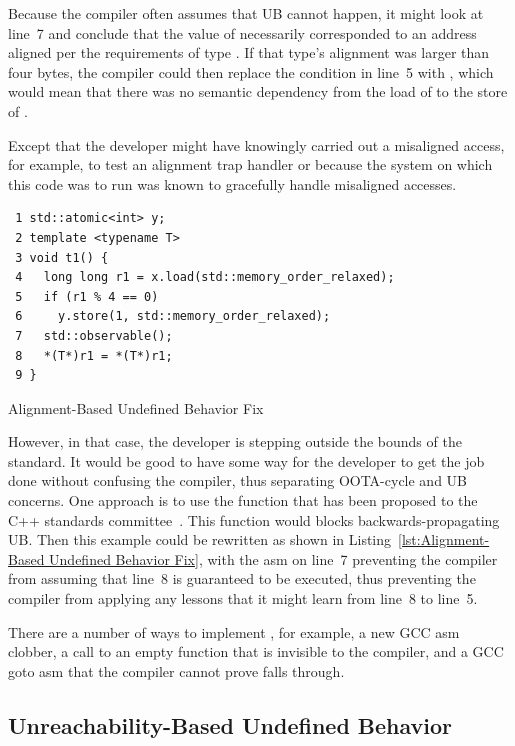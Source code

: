 \documentclass[10]{article}
\begin{document}
Because the compiler often assumes that UB cannot happen, it might
look at line~7 and conclude that the value of  necessarily
corresponded to an address aligned per the requirements of type .
If that type's alignment was larger than four bytes, the compiler could
then replace the condition in line~5 with , which would mean
that there was no semantic dependency from the load of  to the
store of .

Except that the developer might have knowingly carried out a misaligned
access, for example, to test an alignment trap handler or because the
system on which this code was to run was known to gracefully handle
misaligned accesses.

\begin{listing}[tbp]
\begin{verbatim}
 1 std::atomic<int> y;
 2 template <typename T>
 3 void t1() {
 4   long long r1 = x.load(std::memory_order_relaxed);
 5   if (r1 % 4 == 0)
 6     y.store(1, std::memory_order_relaxed);
 7   std::observable();
 8   *(T*)r1 = *(T*)r1;
 9 }
\end{verbatim}
\caption{Alignment-Based Undefined Behavior Fix}
\label{lst:Alignment-Based Undefined Behavior Fix}
\end{listing}

However, in that case, the developer is stepping outside the bounds
of the standard.
It would be good to have some way for the developer to get the job
done without confusing the compiler, thus separating OOTA-cycle and
UB concerns.
One approach is to use the  function
that has been proposed to the C++ standards
committee~\cite{DavisHerring2021P1494R2}.
This function would blocks backwards-propagating UB.
Then this example could be rewritten as shown in
Listing~\ref{lst:Alignment-Based Undefined Behavior Fix},
with the asm on line~7 preventing the compiler from assuming that line~8
is guaranteed to be executed, thus preventing the compiler from
applying any lessons that it might learn from line~8 to line~5.


There are a number of ways to implement ,
for example, a new  GCC asm clobber, a call to an empty
function that is invisible to the compiler, and a GCC goto asm that the
compiler cannot prove falls through.

\subsection{Unreachability-Based Undefined Behavior}
\label{sec:Unreachability-Based Undefined Behavior}
\end{document}
